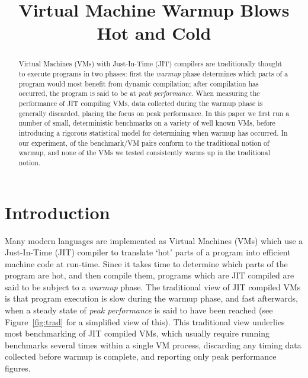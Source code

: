 \documentclass[preprint,numbers,10pt]{sigplanconf}
\begin{document}
\title{Virtual Machine Warmup Blows Hot and Cold}



\maketitle

\begin{abstract}
Virtual Machines (VMs) with Just-In-Time (JIT) compilers are traditionally thought
to execute programs in two phases: first the \emph{warmup} phase determines which
parts of a program would most benefit from dynamic compilation; after
compilation has occurred, the program is said to be at \emph{peak performance}.
When measuring the performance of JIT compiling VMs, data collected
during the warmup phase is generally discarded, placing the focus on peak
performance. In this paper we first run a number of small,
deterministic benchmarks on a variety of well known VMs, before introducing
a rigorous statistical model for determining when warmup has occurred.
In our experiment,  of the benchmark/VM pairs conform to
the traditional notion of warmup, and none of the
VMs we tested consistently warms up in the traditional notion.
\end{abstract}

\section{Introduction}
\label{sec:intro}

Many modern languages are implemented as Virtual Machines (VMs) which use a
Just-In-Time (JIT) compiler to translate `hot' parts of a program into efficient
machine code at run-time. Since it takes time to determine which parts of the
program are hot, and then compile them, programs which are JIT compiled are
said to be subject to a \emph{warmup} phase. The traditional view of
JIT compiled VMs is that program execution is slow during the warmup phase, and
fast afterwards, when a steady state of \emph{peak performance} is said to have been reached
(see Figure~\ref{fig:trad} for a simplified view of this).
This traditional view underlies most benchmarking of JIT compiled VMs, which
usually require running benchmarks several times within a single VM process,
discarding any timing data collected before warmup is complete, and
reporting only peak performance figures.
\end{document}
